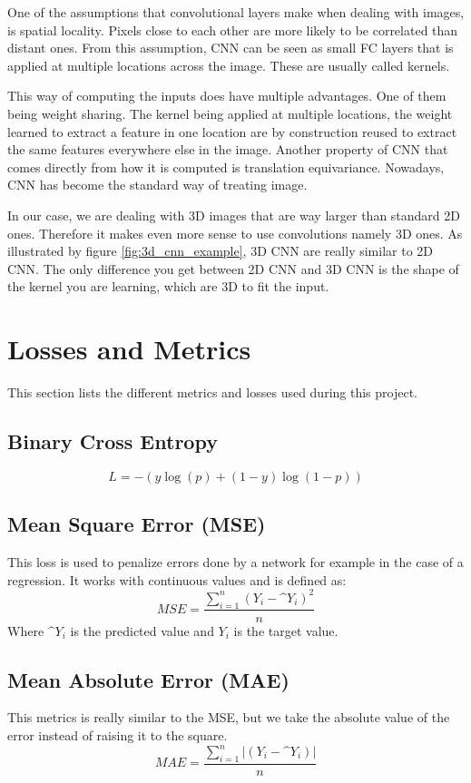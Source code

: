 One of the assumptions that convolutional layers make when dealing with images, is spatial locality. Pixels close to each other are more likely to be correlated than distant ones. From this assumption, CNN can be seen as small FC layers that is applied at multiple locations across the image. These are usually called kernels. 

This way of computing the inputs does have multiple advantages. One of them being weight sharing. The kernel being applied at multiple locations, the weight learned to extract a feature in one location are by construction reused to extract the same features everywhere else in the image. Another property of CNN that comes directly from how it is computed is translation equivariance. Nowadays, CNN has become the standard way of treating image.

In our case, we are dealing with 3D images that are way larger than standard 2D ones. Therefore it makes even more sense to use convolutions namely 3D ones. As illustrated by figure \ref{fig:3d_cnn_example}, 3D CNN are really similar to 2D CNN. The only difference you get between 2D CNN and 3D CNN is the shape of the kernel you are learning, which are 3D to fit the input.



\section{Losses and Metrics}
\label{sec:losses_metrics}
This section lists the different metrics and losses used during this project.

\subsection{Binary Cross Entropy}
\label{sec:binary_cross_entropy}

$$ L = -(y\log(p) + (1-y)\log(1-p))$$

\subsection{Mean Square Error (MSE)}
\label{sec:mean_square_error}
This loss is used to penalize errors done by a network for example in the case of a regression. It works with continuous values and is defined as:
$$ MSE = \frac{\sum_{i=1}^{n} (Y_i - \^{Y}_i)^2}{n}$$
Where $\^{Y}_i$ is the predicted value and $Y_i$ is the target value.
\subsection{Mean Absolute Error (MAE)}
This metrics is really similar to the MSE, but we take the absolute value of the error instead of raising it to the square.
$$ MAE = \frac{\sum_{i=1}^{n} |(Y_i - \^{Y}_i)|}{n}$$
